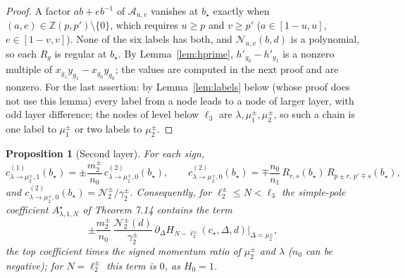 \documentclass[11pt]{article}
\newtheorem{proposition}[theorem]{Proposition}
\theoremstyle{remark}
\begin{document}
\begin{proof}
A factor $ab+eb^{-1}$ of $\mathcal A_{u,v}$ vanishes at $b_\star$ exactly when
$(a,e)\in\mathbb Z(p,p')\setminus\{0\}$, which requires $u\ge p$ and $v\ge p'$
($a\in[1-u,u]$, $e\in[1-v,v]$).  None of the six labels has both, and
$\mathcal N_{u,v}(b,d)$ is a polynomial, so each $R_g$ is regular at
$b_\star$.  By Lemma~\ref{lem:hprime}, $h'_{g_0}-h'_{g_1}$ is a nonzero multiple
of $x_{g_1}y_{g_1}-x_{g_0}y_{g_0}$; the values are computed in the next proof
and are nonzero.  For the last assertion: by Lemma~\ref{lem:labels} below (whose
proof does not use this lemma) every label from a node leads to a node of
larger layer, with odd layer difference; the nodes of level below $\ell_3$ are
$\lambda,\mu^\pm_1,\mu^\pm_2$, so such a chain is one label to $\mu^\pm_1$ or
two labels to $\mu^\pm_2$.
\end{proof}

\begin{proposition}[Second layer]\label{prop:second-layer}
For each sign,
\[
 c^{(1)}_{\lambda\to\mu^\pm_2,1}(b_\star)
 =\pm\frac{m^\pm_2}{n_0}\,c^{(2)}_{\lambda\to\mu^\pm_2,0}(b_\star),
 \qquad
 c^{(2)}_{\lambda\to\mu^\pm_2,0}(b_\star)
 =\mp\frac{n_0}{n_1}\,R_{r,s}(b_\star)\,R_{p\pm r,\,p'\mp s}(b_\star),
\]
and $c^{(2)}_{\lambda\to\mu^\pm_2,0}(b_\star)=\mathcal N^\pm_2/\gamma^\pm_2$.
Consequently, for $\ell^\pm_2\le N<\ell_3$ the simple-pole coefficient
$A^\star_{\lambda,1,N}$ of Theorem 7.14 contains the term
\[
 \pm\frac{m^\pm_2}{n_0}\,\frac{\mathcal N^\pm_2(d)}{\gamma^\pm_2}\,
 \partial_\Delta H_{N-\ell^\pm_2}(c_\star,\Delta,d)\big|_{\Delta=\mu^\pm_2},
\]
the top coefficient times the signed momentum ratio of $\mu^\pm_2$ and
$\lambda$ ($n_0$ can be negative); for $N=\ell^\pm_2$ this term is $0$, as
$H_0=1$.
\end{proposition}
\end{document}
